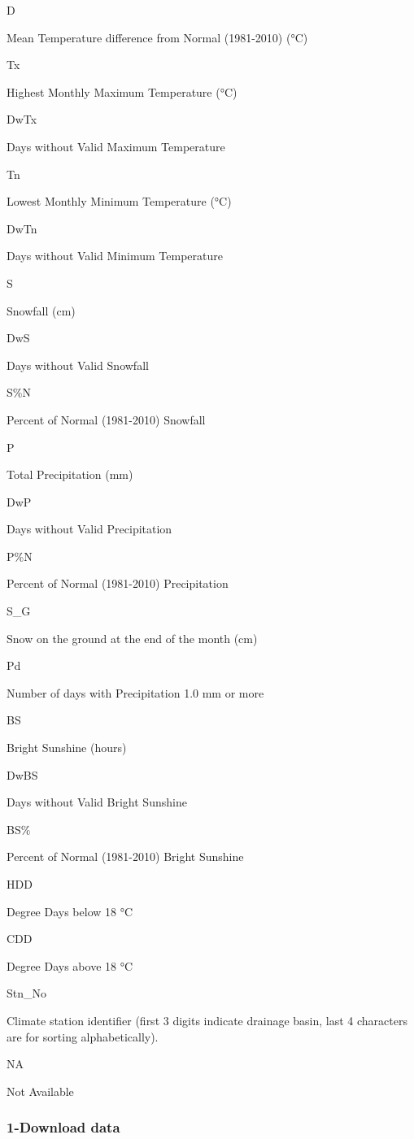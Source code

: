 \documentclass[11pt]{article}
\begin{document}
D

Mean Temperature difference from Normal (1981-2010) (°C)

Tx

Highest Monthly Maximum Temperature (°C)

DwTx

Days without Valid Maximum Temperature

Tn

Lowest Monthly Minimum Temperature (°C)

DwTn

Days without Valid Minimum Temperature

S

Snowfall (cm)

DwS

Days without Valid Snowfall

S\%N

Percent of Normal (1981-2010) Snowfall

P

Total Precipitation (mm)

DwP

Days without Valid Precipitation

P\%N

Percent of Normal (1981-2010) Precipitation

S\_G

Snow on the ground at the end of the month (cm)

Pd

Number of days with Precipitation 1.0 mm or more

BS

Bright Sunshine (hours)

DwBS

Days without Valid Bright Sunshine

BS\%

Percent of Normal (1981-2010) Bright Sunshine

HDD

Degree Days below 18 °C

CDD

Degree Days above 18 °C

Stn\_No

Climate station identifier (first 3 digits indicate drainage basin, last
4 characters are for sorting alphabetically).

NA

Not Available

    \hypertarget{download-data}{%
\subsubsection{1-Download data}\label{download-data}}
\end{document}
